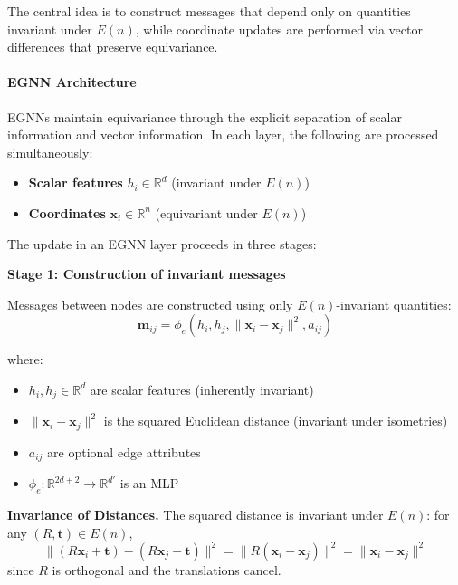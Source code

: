 The central idea is to construct messages that depend only on quantities invariant under $E(n)$, while coordinate updates are performed via vector differences that preserve equivariance.

\paragraph{EGNN Architecture}

EGNNs maintain equivariance through the explicit separation of scalar information and vector information. In each layer, the following are processed simultaneously:
\begin{itemize}
    \item \textbf{Scalar features} $h_i \in \mathbb{R}^d$ (invariant under $E(n)$)
    \item \textbf{Coordinates} $\mathbf{x}_i \in \mathbb{R}^n$ (equivariant under $E(n)$)
\end{itemize}

The update in an EGNN layer proceeds in three stages:

\textbf{Stage 1: Construction of invariant messages}

Messages between nodes are constructed using only $E(n)$-invariant quantities:
\begin{equation}\label{eq:egnn_message}
\mathbf{m}_{ij} = \phi_e(h_i, h_j, \|\mathbf{x}_i - \mathbf{x}_j\|^2, a_{ij})
\end{equation}

where:
\begin{itemize}
    \item $h_i, h_j \in \mathbb{R}^d$ are scalar features (inherently invariant)
    \item $\|\mathbf{x}_i - \mathbf{x}_j\|^2$ is the squared Euclidean distance (invariant under isometries)
    \item $a_{ij}$ are optional edge attributes
    \item $\phi_e: \mathbb{R}^{2d+2} \to \mathbb{R}^{d'}$ is an MLP
\end{itemize}

\textbf{Invariance of Distances.} The squared distance is invariant under $E(n)$: for any $(R, \mathbf{t}) \in E(n)$,
\begin{equation}
\|(R\mathbf{x}_i + \mathbf{t}) - (R\mathbf{x}_j + \mathbf{t})\|^2 = \|R(\mathbf{x}_i - \mathbf{x}_j)\|^2 = \|\mathbf{x}_i - \mathbf{x}_j\|^2
\end{equation}
since $R$ is orthogonal and the translations cancel.

